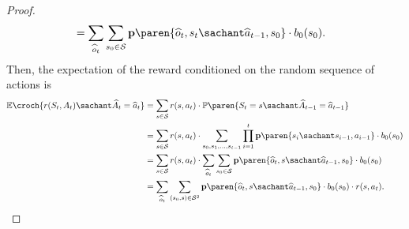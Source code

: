 \begin{proof}
\begin{align*}
& = \displaystyle \sum_{ \widehat{o}_t} \sum_{ s_0 \in \mathcal{S}}  \textbf{p} \paren{ \widehat{o}_t, s_t \sachant \widehat{a}_{t-1}, s_0 } \cdot b_0(s_0).
\end{align*}
Then, the expectation of the reward conditioned on the random sequence of actions is
\begin{align*}
\mathbb{E} \croch{ r(S_t,A_t) \sachant \widehat{A}_{t} = \widehat{a}_{t} } 
&= \sum_{s \in \mathcal{S}} r(s,a_t) \cdot \mathbb{P} \paren{ S_t = s \sachant \widehat{A}_{t-1} = \widehat{a}_{t-1} } \\
&= \sum_{s \in \mathcal{S}} r(s,a_t) \cdot \sum_{s_0,s_1, \ldots, s_{t-1}} \prod_{i=1}^{t} \textbf{p} \paren{ s_i \sachant s_{i-1}, a_{i-1} } \cdot b_0(s_0) \\
&= \sum_{s \in \mathcal{S}} r(s,a_t) \cdot \sum_{ \widehat{o}_t} \sum_{ s_0 \in \mathcal{S}}  \textbf{p} \paren{ \widehat{o}_t, s \sachant \widehat{a}_{t-1}, s_0 } \cdot b_0(s_0)\\
&= \sum_{ \widehat{o}_t} \sum_{(s_0,s) \in \mathcal{S}^2} \textbf{p} \paren{ \widehat{o}_t, s \sachant \widehat{a}_{t-1}, s_0 } \cdot b_0(s_0) \cdot r(s,a_t).
\end{align*}


\end{proof}
